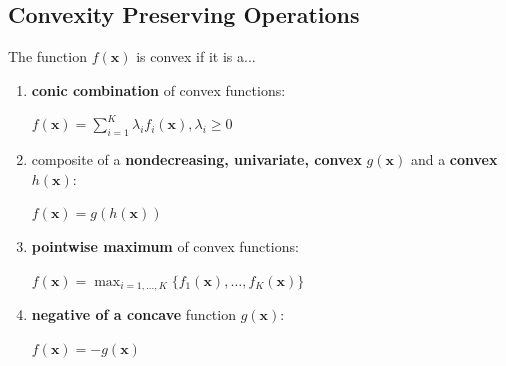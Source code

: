 \documentclass[english]{latex4ei/latex4ei_sheet}
\begin{document}
\begin{sectionbox}
	\subsection{Convexity Preserving Operations}
	\vspace{0.5em}
	The function $f(\bm{x})$ is convex if it is a...
	\begin{enumerate}
		\item \textbf{conic combination} of convex functions:
		\begin{center}
			$f(\bm{x}) = \sum_{i=1}^{K} \lambda_i f_i(\bm{x}), \lambda_i \geq 0$
		\end{center}
		
		\item composite of a \textbf{nondecreasing, univariate, convex} $g(\bm{x})$ and a \textbf{convex} $h(\bm{x})$:
		\begin{center}
			$f(\bm{x}) = g(h(\bm{x}))$
		\end{center}
		
		\item \textbf{pointwise maximum} of convex functions:
		\begin{center}
			$f(\bm{x}) = \max_{i=1,\dots,K}\{f_1(\bm{x}),\dots,f_K(\bm{x})\}$
		\end{center}
	
		\item \textbf{negative of a concave} function $g(\bm{x})$:
		\begin{center}
			$f(\bm{x}) = -g(\bm{x})$
		\end{center}
		
	\end{enumerate}
\end{sectionbox}
\end{document}
